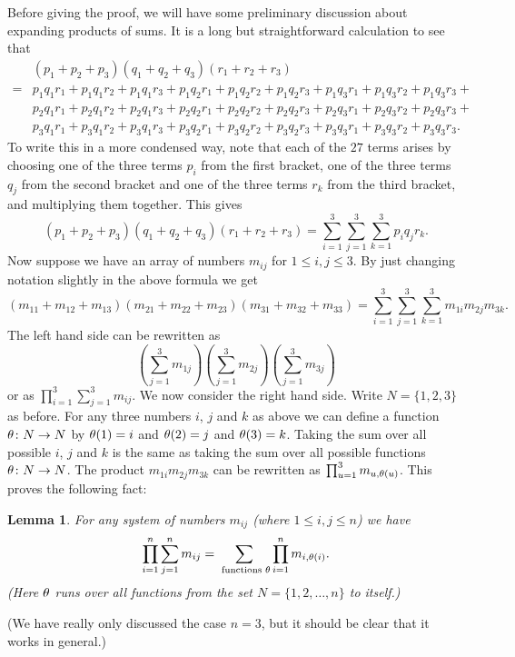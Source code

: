 \documentclass[reqno]{amsart}
\newtheorem{lemma}[theorem]{Lemma}
\theoremstyle{definition}
\begin{document}
Before giving the proof, we will have some preliminary discussion
about expanding products of sums.  It is a long but straightforward
calculation to see that
\begin{align*}
 & (p_1+p_2+p_3)(q_1+q_2+q_3)(r_1+r_2+r_3) \\
 =& p_1q_1r_1+p_1q_1r_2+p_1q_1r_3+
    p_1q_2r_1+p_1q_2r_2+p_1q_2r_3+
    p_1q_3r_1+p_1q_3r_2+p_1q_3r_3+ \\
  & p_2q_1r_1+p_2q_1r_2+p_2q_1r_3+
    p_2q_2r_1+p_2q_2r_2+p_2q_2r_3+
    p_2q_3r_1+p_2q_3r_2+p_2q_3r_3+ \\
  & p_3q_1r_1+p_3q_1r_2+p_3q_1r_3+
    p_3q_2r_1+p_3q_2r_2+p_3q_2r_3+
    p_3q_3r_1+p_3q_3r_2+p_3q_3r_3.
\end{align*}
To write this in a more condensed way, note that each of the $27$
terms arises by choosing one of the three terms $p_i$ from the first
bracket, one of the three terms $q_j$ from the second bracket and one
of the three terms $r_k$ from the third bracket, and multiplying them
together.  This gives
\[ (p_1+p_2+p_3)(q_1+q_2+q_3)(r_1+r_2+r_3) =
    \sum_{i=1}^3\sum_{j=1}^3\sum_{k=1}^3 p_iq_jr_k.
\]
Now suppose we have an array of numbers $m_{ij}$ for
$1\leq i,j\leq 3$.  By just changing notation slightly in the above
formula we get
\[ (m_{11}+m_{12}+m_{13})(m_{21}+m_{22}+m_{23})(m_{31}+m_{32}+m_{33})
    =
    \sum_{i=1}^3\sum_{j=1}^3\sum_{k=1}^3 m_{1i} m_{2j} m_{3k}.
\]
The left hand side can be rewritten as
\[ \left(\sum_{j=1}^3m_{1j}\right)
   \left(\sum_{j=1}^3m_{2j}\right)
   \left(\sum_{j=1}^3m_{3j}\right)
\]
or as $\prod_{i=1}^3\sum_{j=1}^3m_{ij}$.  We now consider the right
hand side.  Write $N=\{1,2,3\}$ as before.  For any three numbers $i$,
$j$ and $k$ as above we can define a function $\theta\colon N\to N$ by
$\theta(1)=i$ and $\theta(2)=j$ and $\theta(3)=k$.  Taking the sum over all
possible $i$, $j$ and $k$ is the same as taking the sum over all
possible functions $\theta\colon N\to N$.  The product $m_{1i}m_{2j}m_{3k}$
can be rewritten as $\prod_{u=1}^3m_{u,\theta(u)}$.  This proves the
following fact:
\begin{lemma}\label{lem-expand}
 For any system of numbers $m_{ij}$ (where $1\leq i,j\leq n$) we have
 \[ \prod_{i=1}^n \sum_{j=1}^n m_{ij} =
     \sum_{\text{ functions } \theta} \prod_{i=1}^n m_{i,\theta(i)}.
 \]
 (Here $\theta$ runs over all functions from the set
 $N=\{1,2,\dotsc,n\}$ to itself.)
\end{lemma}
(We have really only discussed the case $n=3$, but it should be clear
that it works in general.)
\end{document}
